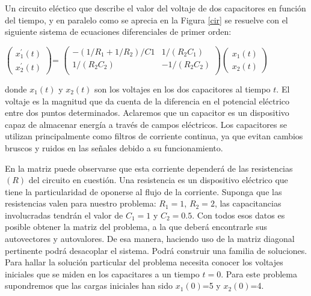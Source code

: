 \begin{answers}

	Un circuito eléctico que describe el valor del voltaje de dos capacitores en función del tiempo, y en paralelo como se aprecia en la Figura \ref{cir} se resuelve con el siguiente sistema de ecuaciones diferenciales  de primer orden:
 
\bigskip
 
	
	$ \left(\begin{array}{c} x^{\prime}_1(t)  \\ x^{\prime}_2(t
 
 ) 
\end{array}
 \right)$= $\left(\begin{array}{cc} -(1/R_1 + 1/R_2)/C1 & 1/(R_2C_1)\\1/(R_2C_2) & -1/(R_2C_2)\\
 \end{array}
 \right)$$ \left(\begin{array}{c} x_1(t)\\x_2(t)
\end{array}
 \right)$

 \bigskip
 
 
	\bigskip
 
	\noindent donde $x_1(t)$ y $x_2(t)$ son los voltajes en los dos capacitores al tiempo $t$. El voltaje es la magnitud que da cuenta de la diferencia en el potencial eléctrico entre dos puntos determinados. Aclaremos que un capacitor es un dispositivo capaz de almacenar energía a través de campos eléctricos. Los capacitores se utilizan principalmente como filtros de corriente continua, ya que evitan cambios bruscos y ruidos en las señales debido a su funcionamiento. 
 
 En la matriz puede observarse que esta corriente dependerá de las resistencias $(R)$ del circuito en cuestión. Una resistencia  es un dispositivo eléctrico que tiene la particularidad de oponerse al flujo de la corriente. Suponga que las resistencias valen para nuestro problema: $R_1=1$, $R_2=2$, las capacitancias involucradas tendrán el valor de $C_1= 1$ y $C_2=0.5$. Con todos esos datos es posible  obtener  la matriz del problema, a la que deberá encontrarle sus autovectores y autovalores. De esa manera, haciendo uso de la matriz diagonal pertinente podrá desacoplar el sistema. Podrá construir una familia de soluciones.  Para hallar la solución particular del problema necesita conocer los voltajes iniciales que se miden en los capacitares  a un tiempo $t=0$. Para este problema supondremos que las cargas iniciales han sido $x_1(0)$=5 y $x_2(0)$=4.
 

\end{answers}
